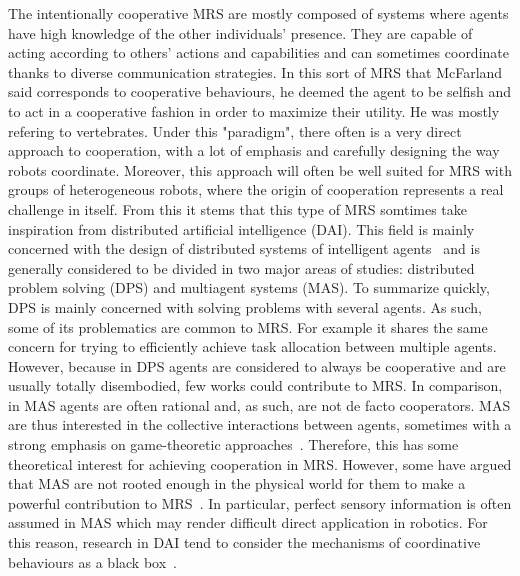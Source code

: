     The intentionally cooperative MRS are mostly composed of systems where agents have high knowledge of the other individuals' presence. They are capable of acting according to others' actions and capabilities and can sometimes coordinate thanks to diverse communication strategies. In this sort of MRS that McFarland said corresponds to cooperative behaviours, he deemed the agent to be selfish and to act in a cooperative fashion in order to maximize their utility. He was mostly refering to vertebrates. Under this "paradigm", there often is a very direct approach to cooperation, with a lot of emphasis and carefully designing the way robots coordinate. Moreover, this approach will often be well suited for MRS with groups of heterogeneous robots, where the origin of cooperation represents a real challenge in itself. From this it stems that this type of MRS somtimes take inspiration from distributed artificial intelligence (DAI). This field is mainly concerned with the design of distributed systems of intelligent agents~\cite{Cao1997, Panait2005} and is generally considered to be divided in two major areas of studies: distributed problem solving (DPS) and multiagent systems (MAS). To summarize quickly, DPS is mainly concerned with solving problems with several agents. As such, some of its problematics are common to MRS. For example it shares the same concern for trying to efficiently achieve task allocation between multiple agents. However, because in DPS agents are considered to always be cooperative and are usually totally disembodied, few works could contribute to MRS. In comparison, in MAS agents are often rational and, as such, are not de facto cooperators. MAS are thus interested in the collective interactions between agents, sometimes with a strong emphasis on game-theoretic approaches~\cite{Rosenschein1985}. Therefore, this has some theoretical interest for achieving cooperation in MRS. However, some have argued that MAS are not rooted enough in the physical world for them to make a powerful contribution to MRS~\cite{Cao1997, Farinelli2005}. In particular, perfect sensory information is often assumed in MAS which may render difficult direct application in robotics. For this reason, research in DAI tend to consider the mechanisms of coordinative behaviours as a black box~\cite{Parker1994}.



